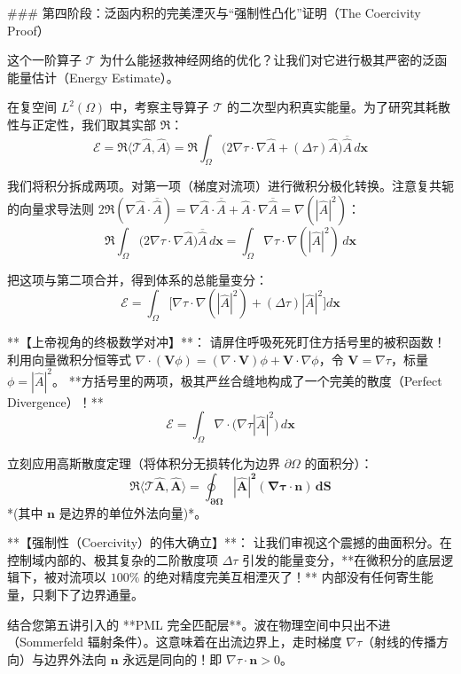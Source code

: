 \documentclass[12pt]{article}
\begin{document}
{### 第四阶段：泛函内积的完美湮灭与“强制性凸化”证明（The Coercivity Proof）

这个一阶算子 $\mathcal{T}$ 为什么能拯救神经网络的优化？让我们对它进行极其严密的泛函能量估计（Energy Estimate）。

在复空间 $L^2(\Omega)$ 中，考察主导算子 $\mathcal{T}$ 的二次型内积真实能量。为了研究其耗散性与正定性，我们取其实部 $\Re$：
$$ \mathcal{E} = \Re \langle \mathcal{T} \hat{A}, \hat{A} \rangle = \Re \int_{\Omega} \Big( 2 \nabla \tau \cdot \nabla \hat{A} + (\Delta \tau) \hat{A} \Big) \overline{\hat{A}} \, d\mathbf{x} $$

我们将积分拆成两项。对第一项（梯度对流项）进行微积分极化转换。注意复共轭的向量求导法则 $2 \Re(\nabla \hat{A} \cdot \overline{\hat{A}}) = \nabla \hat{A} \cdot \overline{\hat{A}} + \hat{A} \cdot \nabla \overline{\hat{A}} = \nabla (|\hat{A}|^2)$：
$$ \Re \int_{\Omega} \big( 2 \nabla \tau \cdot \nabla \hat{A} \big) \overline{\hat{A}} \, d\mathbf{x} = \int_{\Omega} \nabla \tau \cdot \nabla \left( |\hat{A}|^2 \right) \, d\mathbf{x} $$

把这项与第二项合并，得到体系的总能量变分：
$$ \mathcal{E} = \int_{\Omega} \Big[ \nabla \tau \cdot \nabla \left( |\hat{A}|^2 \right) + (\Delta \tau) |\hat{A}|^2 \Big] d\mathbf{x} $$

**【上帝视角的终极数学对冲】**：
请屏住呼吸死死盯住方括号里的被积函数！
利用向量微积分恒等式 $\nabla \cdot (\mathbf{V} \phi) = (\nabla \cdot \mathbf{V})\phi + \mathbf{V} \cdot \nabla \phi$，令 $\mathbf{V} = \nabla \tau$，标量 $\phi = |\hat{A}|^2$。
**方括号里的两项，极其严丝合缝地构成了一个完美的散度（Perfect Divergence）！**
$$ \mathcal{E} = \int_{\Omega} \nabla \cdot \big( \nabla \tau |\hat{A}|^2 \big) \, d\mathbf{x} $$

立刻应用高斯散度定理（将体积分无损转化为边界 $\partial \Omega$ 的面积分）：
$$ \mathbf{\Re \langle \mathcal{T} \hat{A}, \hat{A} \rangle = \oint_{\partial \Omega} |\hat{A}|^2 (\nabla \tau \cdot \mathbf{n}) \, dS} $$
*(其中 $\mathbf{n}$ 是边界的单位外法向量)*。

**【强制性（Coercivity）的伟大确立】**：
让我们审视这个震撼的曲面积分。在控制域内部的、极其复杂的二阶散度项 $\Delta \tau$ 引发的能量变分，**在微积分的底层逻辑下，被对流项以 $100\%$ 的绝对精度完美互相湮灭了！**
内部没有任何寄生能量，只剩下了边界通量。

结合您第五讲引入的 **PML 完全匹配层**。波在物理空间中只出不进（Sommerfeld 辐射条件）。这意味着在出流边界上，走时梯度 $\nabla \tau$（射线的传播方向）与边界外法向 $\mathbf{n}$ 永远是同向的！即 $\nabla \tau \cdot \mathbf{n} > 0$。

}
\end{document}
